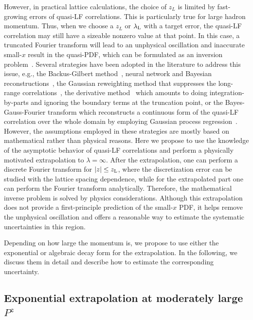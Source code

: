 However, in practical lattice calculations, the choice of $z_L$ is limited by fast-growing errors of quasi-LF correlations. This is particularly true for large hadron momentum.
Thus, when we choose a $z_L$ or $\lambda_{\rm L}$ with a target error, the quasi-LF correlation may still have a sizeable nonzero value at that point. In this case, a truncated Fourier transform will lead to an unphysical oscillation and inaccurate small-$x$ result in the quasi-PDF, which can be formulated as an inversion problem~\cite{Karpie:2019eiq}. Several strategies have been adopted in the literature to address this issue, e.g., the Backus-Gilbert method~\cite{Karpie:2019eiq,Bhat:2020ktg}, neural network and Bayesian reconstructions~\cite{Karpie:2019eiq}, the Gaussian reweighting method that suppresses the long-range correlations~\cite{Ishikawa:2019flg}, the derivative method~\cite{Lin:2017ani} which amounts to doing integration-by-parts and ignoring the boundary terms at the truncation point, or the Bayes-Gauss-Fourier transform which reconstructs a continuous form of the quasi-LF correlation over the whole domain by employing Gaussian process regression~\cite{Alexandrou:2020tqq}. However, the assumptions employed in these strategies are mostly based on mathematical rather than physical reasons. Here we propose to use the knowledge of the asymptotic behavior of quasi-LF correlations and perform a physically motivated extrapolation to $\lambda\!=\!\infty$.
After the extrapolation, one can perform a discrete Fourier transform for $|z|\le z_{\rm L}$, where the discretization error can be studied with the lattice spacing dependence, while for the extrapolated part one can perform the Fourier transform analytically. Therefore, the mathematical inverse problem is solved by physics considerations.
Although this extrapolation does not provide a first-principle prediction of the small-$x$ PDF, it helps remove the unphysical oscillation and offers a reasonable way to estimate the systematic uncertainties in this region.

Depending on how large the momentum is, we propose to use either the exponential or algebraic decay form for the extrapolation. In the following, we discuss them in detail and describe how to estimate the corresponding uncertainty.


\subsection{Exponential extrapolation at moderately large $P^z$}

